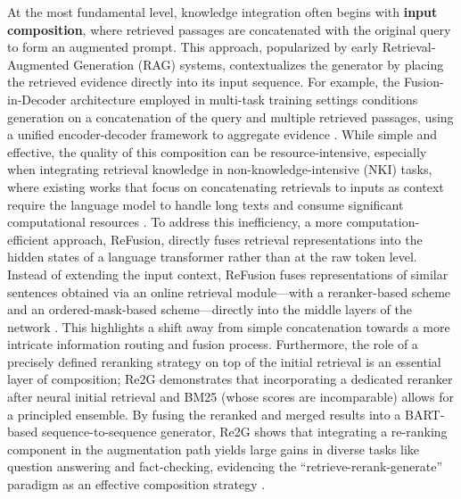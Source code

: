 \documentclass[11pt]{article}
\begin{document}
At the most fundamental level, knowledge integration often begins with \textbf{input composition}, where retrieved passages are concatenated with the original query to form an augmented prompt. This approach, popularized by early Retrieval-Augmented Generation (RAG) systems, contextualizes the generator by placing the retrieved evidence directly into its input sequence. For example, the Fusion-in-Decoder architecture employed in multi-task training settings conditions generation on a concatenation of the query and multiple retrieved passages, using a unified encoder-decoder framework to aggregate evidence \cite{ref37}. While simple and effective, the quality of this composition can be resource-intensive, especially when integrating retrieval knowledge in non-knowledge-intensive (NKI) tasks, where existing works that focus on concatenating retrievals to inputs as context require the language model to handle long texts and consume significant computational resources \cite{ref38}. To address this inefficiency, a more computation-efficient approach, ReFusion, directly fuses retrieval representations into the hidden states of a language transformer rather than at the raw token level. Instead of extending the input context, ReFusion fuses representations of similar sentences obtained via an online retrieval module---with a reranker-based scheme and an ordered-mask-based scheme---directly into the middle layers of the network \cite{ref38}. This highlights a shift away from simple concatenation towards a more intricate information routing and fusion process. Furthermore, the role of a precisely defined reranking strategy on top of the initial retrieval is an essential layer of composition; Re2G demonstrates that incorporating a dedicated reranker after neural initial retrieval and BM25 (whose scores are incomparable) allows for a principled ensemble. By fusing the reranked and merged results into a BART-based sequence-to-sequence generator, Re2G shows that integrating a re-ranking component in the augmentation path yields large gains in diverse tasks like question answering and fact-checking, evidencing the ``retrieve-rerank-generate'' paradigm as an effective composition strategy \cite{ref39}.
\end{document}
